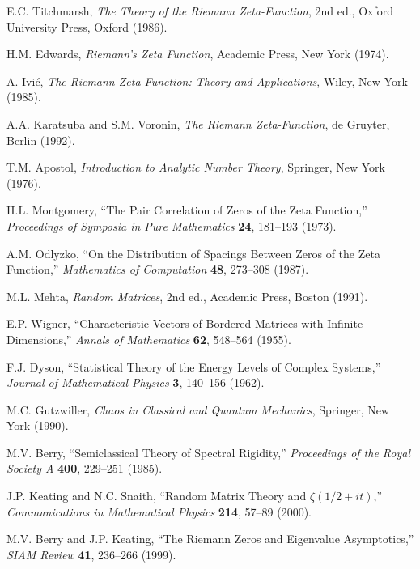 \documentclass[11pt]{article}
\theoremstyle{plain}
\theoremstyle{definition}
\theoremstyle{remark}
\begin{document}
\begin{thebibliography}{99}
 E.C. Titchmarsh, \emph{The Theory of the Riemann Zeta-Function}, 2nd ed., Oxford University Press, Oxford (1986).

 H.M. Edwards, \emph{Riemann's Zeta Function}, Academic Press, New York (1974).

 A. Ivić, \emph{The Riemann Zeta-Function: Theory and Applications}, Wiley, New York (1985).

 A.A. Karatsuba and S.M. Voronin, \emph{The Riemann Zeta-Function}, de Gruyter, Berlin (1992).

 T.M. Apostol, \emph{Introduction to Analytic Number Theory}, Springer, New York (1976).

 H.L. Montgomery, ``The Pair Correlation of Zeros of the Zeta Function,'' \emph{Proceedings of Symposia in Pure Mathematics} \textbf{24}, 181--193 (1973).

 A.M. Odlyzko, ``On the Distribution of Spacings Between Zeros of the Zeta Function,'' \emph{Mathematics of Computation} \textbf{48}, 273--308 (1987).

 M.L. Mehta, \emph{Random Matrices}, 2nd ed., Academic Press, Boston (1991).

 E.P. Wigner, ``Characteristic Vectors of Bordered Matrices with Infinite Dimensions,'' \emph{Annals of Mathematics} \textbf{62}, 548--564 (1955).

 F.J. Dyson, ``Statistical Theory of the Energy Levels of Complex Systems,'' \emph{Journal of Mathematical Physics} \textbf{3}, 140--156 (1962).

 M.C. Gutzwiller, \emph{Chaos in Classical and Quantum Mechanics}, Springer, New York (1990).

 M.V. Berry, ``Semiclassical Theory of Spectral Rigidity,'' \emph{Proceedings of the Royal Society A} \textbf{400}, 229--251 (1985).

 J.P. Keating and N.C. Snaith, ``Random Matrix Theory and $\zeta(1/2+it)$,'' \emph{Communications in Mathematical Physics} \textbf{214}, 57--89 (2000).

 M.V. Berry and J.P. Keating, ``The Riemann Zeros and Eigenvalue Asymptotics,'' \emph{SIAM Review} \textbf{41}, 236--266 (1999).


\end{thebibliography}
\end{document}
